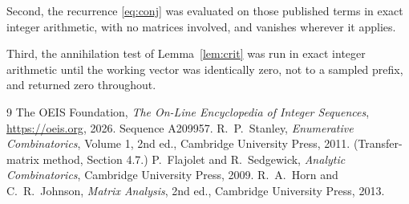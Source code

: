 \documentclass[11pt,a4paper]{article}
\theoremstyle{plain}
\theoremstyle{definition}
\begin{document}
Second, the recurrence \eqref{eq:conj} was evaluated on those published terms in exact
integer arithmetic, with no matrices involved, and vanishes wherever it applies.

Third, the annihilation test of Lemma~\ref{lem:crit} was run in exact integer arithmetic
until the working vector was identically zero, not to a sampled prefix, and returned zero
throughout.

\begin{thebibliography}{9}
 The OEIS Foundation, \emph{The On-Line Encyclopedia of Integer
Sequences}, \url{https://oeis.org}, 2026. Sequence A209957.
 R.~P.~Stanley, \emph{Enumerative Combinatorics}, Volume 1, 2nd ed.,
Cambridge University Press, 2011. (Transfer-matrix method, Section 4.7.)
 P.~Flajolet and R.~Sedgewick, \emph{Analytic Combinatorics}, Cambridge
University Press, 2009.
 R.~A.~Horn and C.~R.~Johnson, \emph{Matrix Analysis}, 2nd ed., Cambridge
University Press, 2013.
\end{thebibliography}
\end{document}
